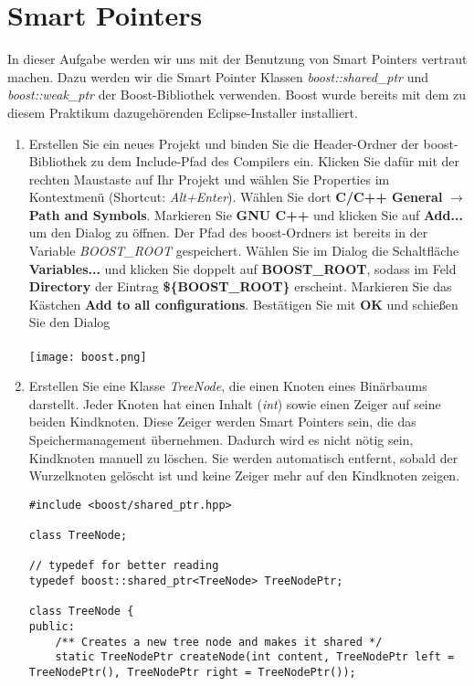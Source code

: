 \documentclass[
  accentcolor=tud1c,	%
  colorbacktitle,		%
  inverttitle,			%
  german,				%
  twoside
]{tudexercise}
\begin{document}
\section{Smart Pointers}
In dieser Aufgabe werden wir uns mit der Benutzung von Smart Pointers vertraut machen. Dazu werden wir die Smart Pointer Klassen \emph{boost::shared\_ptr} und \emph{boost::weak\_ptr} der Boost-Bibliothek verwenden. Boost wurde bereits mit dem zu diesem Praktikum dazugehörenden Eclipse-Installer installiert. 

\begin{enumerate}
\item Erstellen Sie ein neues Projekt und binden Sie die Header-Ordner der boost-Bibliothek zu dem Include-Pfad des Compilers ein. Klicken Sie dafür mit der rechten Maustaste auf Ihr Projekt und wählen Sie Properties
im Kontextmenü (Shortcut: \emph{Alt+Enter}). Wählen Sie dort \textbf{C/C++ General} $\rightarrow$ \textbf{Path and Symbols}. Markieren Sie \textbf{GNU C++} und klicken Sie auf \textbf{Add...} um den Dialog zu öffnen. Der Pfad des boost-Ordners ist bereits in der Variable \emph{BOOST\_ROOT} gespeichert.
Wählen Sie im Dialog die Schaltfläche \textbf{Variables...} und klicken Sie doppelt auf \textbf{BOOST\_ROOT}, sodass im Feld \textbf{Directory} der Eintrag \textbf{\$\{BOOST\_ROOT\}} erscheint.
Markieren Sie das Kästchen \textbf{Add to all configurations}. Bestätigen Sie mit \textbf{OK} und schießen Sie den Dialog\\\\
\texttt{[image: boost.png]}

\item Erstellen Sie eine Klasse \emph{TreeNode}, die einen Knoten eines Binärbaums darstellt. Jeder Knoten hat einen Inhalt (\emph{int}) sowie einen Zeiger auf seine beiden Kindknoten. Diese Zeiger werden Smart Pointers sein, die das Speichermanagement übernehmen. Dadurch wird es nicht nötig sein, Kindknoten manuell zu löschen. Sie werden automatisch entfernt, sobald der Wurzelknoten gelöscht ist und keine Zeiger mehr auf den Kindknoten zeigen.

\begin{lstlisting}
#include <boost/shared_ptr.hpp>

class TreeNode;

// typedef for better reading
typedef boost::shared_ptr<TreeNode> TreeNodePtr;

class TreeNode {
public:
	/** Creates a new tree node and makes it shared */
	static TreeNodePtr createNode(int content, TreeNodePtr left = TreeNodePtr(), TreeNodePtr right = TreeNodePtr());


\end{lstlisting}
\end{enumerate}
\end{document}
